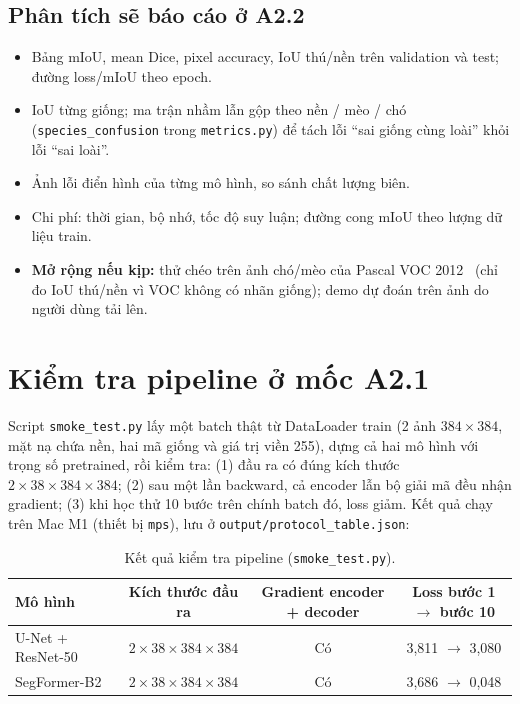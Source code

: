 \documentclass[12pt]{article}
\newcommand{\code}[1]{\texttt{#1}}
\newcommand{\st}[1]{\textbf{#1}}
\begin{document}
\subsection{Phân tích sẽ báo cáo ở A2.2}
\begin{itemize}
  \item Bảng mIoU, mean Dice, pixel accuracy, IoU thú/nền trên validation và test; đường loss/mIoU theo epoch.
  \item IoU từng giống; ma trận nhầm lẫn gộp theo nền / mèo / chó (\code{species\_confusion} trong \code{metrics.py}) để tách
        lỗi ``sai giống cùng loài'' khỏi lỗi ``sai loài''.
  \item Ảnh lỗi điển hình của từng mô hình, so sánh chất lượng biên.
  \item Chi phí: thời gian, bộ nhớ, tốc độ suy luận; đường cong mIoU theo lượng dữ liệu train.
  \item \st{Mở rộng nếu kịp:} thử chéo trên ảnh chó/mèo của Pascal VOC 2012~\cite{everingham2010} (chỉ đo IoU thú/nền vì VOC
        không có nhãn giống); demo dự đoán trên ảnh do người dùng tải lên.
\end{itemize}

\section{Kiểm tra pipeline ở mốc A2.1}
Script \code{smoke\_test.py} lấy một batch thật từ DataLoader train (2 ảnh $384\times384$, mặt nạ chứa nền, hai mã giống và
giá trị viền 255), dựng cả hai mô hình với trọng số pretrained, rồi kiểm tra: (1) đầu ra có đúng kích thước
$2\times38\times384\times384$; (2) sau một lần backward, cả encoder lẫn bộ giải mã đều nhận gradient; (3) khi học thử 10 bước
trên chính batch đó, loss giảm. Kết quả chạy trên Mac M1 (thiết bị \code{mps}), lưu ở \code{output/protocol\_table.json}:

\begin{table}[H]
\centering
\caption{Kết quả kiểm tra pipeline (\code{smoke\_test.py}).}\label{tab:smoke}
\begin{tabularx}{\linewidth}{@{}lCCC@{}}
\toprule
Mô hình & Kích thước đầu ra & Gradient encoder + decoder & Loss bước 1 $\rightarrow$ bước 10 \\\midrule
U-Net + ResNet-50 & $2\times38\times384\times384$ & Có & 3,811 $\rightarrow$ 3,080 \\
SegFormer-B2      & $2\times38\times384\times384$ & Có & 3,686 $\rightarrow$ 0,048 \\
\bottomrule
\end{tabularx}
\end{table}
\end{document}
